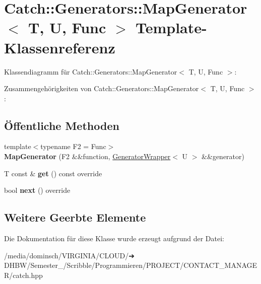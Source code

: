 \hypertarget{classCatch_1_1Generators_1_1MapGenerator}{}\section{Catch\+:\+:Generators\+:\+:Map\+Generator$<$ T, U, Func $>$ Template-\/\+Klassenreferenz}
\label{classCatch_1_1Generators_1_1MapGenerator}


Klassendiagramm für Catch\+:\+:Generators\+:\+:Map\+Generator$<$ T, U, Func $>$\+:


Zusammengehörigkeiten von Catch\+:\+:Generators\+:\+:Map\+Generator$<$ T, U, Func $>$\+:
\subsection*{Öffentliche Methoden}
\begin{DoxyCompactItemize}
\item 
\mbox{\label{classCatch_1_1Generators_1_1MapGenerator_a525c7eaf53ad220ee7add534aff2522c}} 
{\footnotesize template$<$typename F2  = Func$>$ }\\{\bfseries Map\+Generator} (F2 \&\&function, \hyperlink{classCatch_1_1Generators_1_1GeneratorWrapper}{Generator\+Wrapper}$<$ U $>$ \&\&generator)
\item 
\mbox{\label{classCatch_1_1Generators_1_1MapGenerator_a199d377afba00519f202c59b4b488235}} 
T const  \& {\bfseries get} () const override
\item 
\mbox{\label{classCatch_1_1Generators_1_1MapGenerator_aa07e2f12d38ae060c30cc30d9dc236c5}} 
bool {\bfseries next} () override
\end{DoxyCompactItemize}
\subsection*{Weitere Geerbte Elemente}


Die Dokumentation für diese Klasse wurde erzeugt aufgrund der Datei\+:\begin{DoxyCompactItemize}
\item 
/media/dominsch/\+V\+I\+R\+G\+I\+N\+I\+A/\+C\+L\+O\+U\+D/➔ D\+H\+B\+W/\+Semester\+\_/\+Scribble/\+Programmieren/\+P\+R\+O\+J\+E\+C\+T/\+C\+O\+N\+T\+A\+C\+T\+\_\+\+M\+A\+N\+A\+G\+E\+R/catch.\+hpp\end{DoxyCompactItemize}
